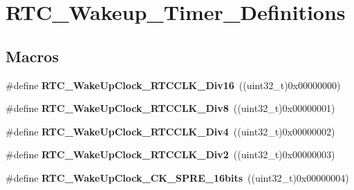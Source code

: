 \hypertarget{group___r_t_c___wakeup___timer___definitions}{}\section{R\+T\+C\+\_\+\+Wakeup\+\_\+\+Timer\+\_\+\+Definitions}
\label{group___r_t_c___wakeup___timer___definitions}
\subsection*{Macros}
\begin{DoxyCompactItemize}
\item 
\hypertarget{group___r_t_c___wakeup___timer___definitions_ga3bdf3ccdb6fe77e36def1091619fd4a0}{}\#define {\bfseries R\+T\+C\+\_\+\+Wake\+Up\+Clock\+\_\+\+R\+T\+C\+C\+L\+K\+\_\+\+Div16}~((uint32\+\_\+t)0x00000000)\label{group___r_t_c___wakeup___timer___definitions_ga3bdf3ccdb6fe77e36def1091619fd4a0}

\item 
\hypertarget{group___r_t_c___wakeup___timer___definitions_gaac36e5571c3523da94c05698e9c6a5e1}{}\#define {\bfseries R\+T\+C\+\_\+\+Wake\+Up\+Clock\+\_\+\+R\+T\+C\+C\+L\+K\+\_\+\+Div8}~((uint32\+\_\+t)0x00000001)\label{group___r_t_c___wakeup___timer___definitions_gaac36e5571c3523da94c05698e9c6a5e1}

\item 
\hypertarget{group___r_t_c___wakeup___timer___definitions_ga5fc37ef693f9a015bfb0e6dd8706fef0}{}\#define {\bfseries R\+T\+C\+\_\+\+Wake\+Up\+Clock\+\_\+\+R\+T\+C\+C\+L\+K\+\_\+\+Div4}~((uint32\+\_\+t)0x00000002)\label{group___r_t_c___wakeup___timer___definitions_ga5fc37ef693f9a015bfb0e6dd8706fef0}

\item 
\hypertarget{group___r_t_c___wakeup___timer___definitions_ga26b1be336e8cea784dfc7d9d0347f3f7}{}\#define {\bfseries R\+T\+C\+\_\+\+Wake\+Up\+Clock\+\_\+\+R\+T\+C\+C\+L\+K\+\_\+\+Div2}~((uint32\+\_\+t)0x00000003)\label{group___r_t_c___wakeup___timer___definitions_ga26b1be336e8cea784dfc7d9d0347f3f7}

\item 
\hypertarget{group___r_t_c___wakeup___timer___definitions_ga310ac1a50bca0c799f4e34c51a785f84}{}\#define {\bfseries R\+T\+C\+\_\+\+Wake\+Up\+Clock\+\_\+\+C\+K\+\_\+\+S\+P\+R\+E\+\_\+16bits}~((uint32\+\_\+t)0x00000004)\label{group___r_t_c___wakeup___timer___definitions_ga310ac1a50bca0c799f4e34c51a785f84}


\end{DoxyCompactItemize}
